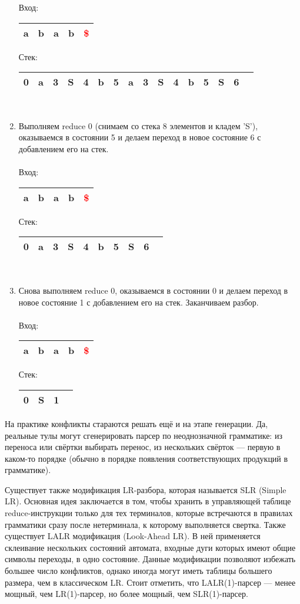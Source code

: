 \begin{example}
\begin{enumerate}
Вход: \,
\begin{tabular}[c]{ |c|c|c|c|c| } 
    \hline a & b & a & b & \textcolor{red}{\$} \\ \hline
\end{tabular}
\qquad Стек: \,
\begin{tabular}[c]{ |c|c|c|c|c|c|c|c|c|c|c|c|c|c|c|c } 
    \hline 0 & a & 3 & S & 4 & b & 5 & a & 3 & S & 4 & b & 5 & S & 6 & \\ \hline
\end{tabular}
\\
\item Выполняем reduce 0 (снимаем со стека 8 элементов и кладем 'S'), оказываемся в состоянии 5 и делаем переход в новое состояние 6 с добавлением его на стек. \\ \\
Вход: \,
\begin{tabular}[c]{ |c|c|c|c|c| } 
    \hline a & b & a & b & \textcolor{red}{\$} \\ \hline
\end{tabular}
\qquad Стек: \,
\begin{tabular}[c]{ |c|c|c|c|c|c|c|c|c|c } 
    \hline 0 & a & 3 & S & 4 & b & 5 & S & 6 & \\ \hline
\end{tabular}
\\
\item Снова выполняем reduce 0, оказываемся в состоянии 0 и делаем переход в новое состояние 1 с добавлением его на стек. Заканчиваем разбор. \\ \\
Вход: \,
\begin{tabular}[c]{ |c|c|c|c|c| } 
    \hline a & b & a & b & \textcolor{red}{\$} \\ \hline
\end{tabular}
\qquad Стек: \,
\begin{tabular}[c]{ |c|c|c|c } 
    \hline 0 & S & 1 & \\ \hline
\end{tabular}
\end{enumerate}
\end{example}

На практике конфликты стараются решать ещё и на этапе генерации.
Да, реальные тулы могут сгенерировать парсер по неоднозначной грамматике: из переноса или свёртки выбирать перенос, из нескольких свёрток --- первую в каком-то порядке (обычно в порядке появления соответствующих продукций в грамматике).

Существует также модификация LR-разбора, которая называется SLR (Simple LR). 
Основная идея заключается в том, чтобы хранить в управляющей таблице reduce-инструкции только для тех терминалов, которые встречаются в правилах грамматики сразу после нетерминала, к которому выполняется свертка. 
Также существует LALR модификация (Look-Ahead LR).
В ней применяется склеивание нескольких состояний автомата, входные дуги которых имеют общие символы переходы, в одно состояние.
Данные модификации позволяют избежать большее число конфликтов, однако иногда могут иметь таблицы большего размера, чем в классическом LR.
Стоит отметить, что LALR(1)-парсер --- менее мощный, чем LR(1)-парсер, но более мощный, чем SLR(1)-парсер.


